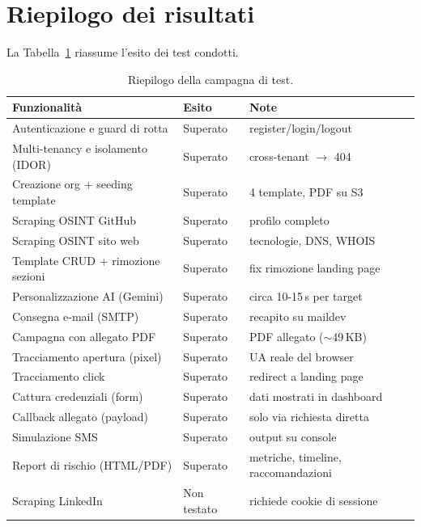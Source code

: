 \documentclass[12pt,a4paper,oneside]{report}
\begin{document}
\section{Riepilogo dei risultati}
La Tabella~\ref{tab:tests} riassume l'esito dei test condotti.

\begin{table}[h]
\centering
\caption{Riepilogo della campagna di test.}
\label{tab:tests}
\small
\begin{tabular}{@{}p{6.6cm}p{2.4cm}p{4.0cm}@{}}
\toprule
\textbf{Funzionalit\`a} & \textbf{Esito} & \textbf{Note} \\
\midrule
Autenticazione e guard di rotta & Superato & register/login/logout \\
Multi-tenancy e isolamento (IDOR) & Superato & cross-tenant $\rightarrow$ 404 \\
Creazione org + seeding template & Superato & 4 template, PDF su S3 \\
Scraping OSINT GitHub & Superato & profilo completo \\
Scraping OSINT sito web & Superato & tecnologie, DNS, WHOIS \\
Template CRUD + rimozione sezioni & Superato & fix rimozione landing page \\
Personalizzazione AI (Gemini) & Superato & circa 10-15\,s per target \\
Consegna e-mail (SMTP) & Superato & recapito su maildev \\
Campagna con allegato PDF & Superato & PDF allegato ($\sim$49\,KB) \\
Tracciamento apertura (pixel) & Superato & UA reale del browser \\
Tracciamento click & Superato & redirect a landing page \\
Cattura credenziali (form) & Superato & dati mostrati in dashboard \\
Callback allegato (payload) & Superato & solo via richiesta diretta \\
Simulazione SMS & Superato & output su console \\
Report di rischio (HTML/PDF) & Superato & metriche, timeline, raccomandazioni \\
Scraping LinkedIn & Non testato & richiede cookie di sessione \\
\bottomrule
\end{tabular}
\end{table}

\end{document}
